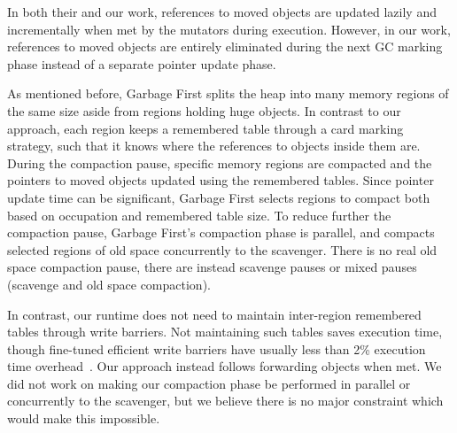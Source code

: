 \documentclass[sigplan,10pt,review,anonymous]{acmart}\settopmatter{printfolios=true,printccs=false,printacmref=false}
\newcommand{\egb}[1]{\color{blue}\fbox{\bfseries\sffamily\scriptsize Elisa:}{\sf\small$\blacktriangleright$\textit{#1}$\blacktriangleleft$}\color{black}}
\begin{document}
In both their and our work, references to moved objects are updated lazily and incrementally when met by the mutators during execution.
However, in our work, references to moved objects are entirely eliminated during the next GC marking phase instead of a separate pointer update phase.

As mentioned before, Garbage First \cite{G1} splits the heap into many memory regions of the same size aside from regions holding huge objects. In contrast to our approach, each region keeps a remembered table through a card marking strategy, such that it knows where the references to objects inside them are. During the compaction pause, specific memory regions are compacted and the pointers to moved objects updated using the remembered tables. Since pointer update time can be significant, Garbage First selects regions to compact both based on occupation and remembered table size. To reduce further the compaction pause, Garbage First's compaction phase is parallel, and compacts selected regions of old space concurrently to the scavenger. There is no real old space compaction pause, there are instead scavenge pauses or mixed pauses (scavenge and old space compaction). 

In contrast, our runtime does not need to maintain inter-region remembered tables through write barriers. Not maintaining such tables saves execution time, though fine-tuned efficient write barriers have usually less than 2\% execution time overhead~\cite{BarriersFriendFoe}. Our approach  instead follows forwarding objects when met.
We did not work on making our compaction phase be performed in parallel or concurrently to the scavenger, but we believe there is no major constraint which would make this impossible. 
\end{document}
